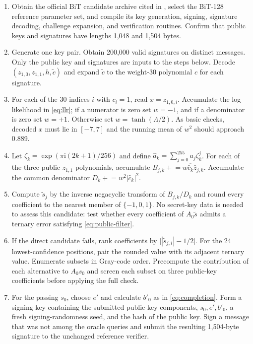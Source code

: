 \documentclass[11pt,a4paper]{article}
\begin{document}
\begin{enumerate}[leftmargin=1.7em]
  \item Obtain the official BiT candidate archive cited in \cite{BiT}, select
        the BiT-128 reference parameter set, and compile its key generation,
        signing, signature decoding, challenge expansion, and verification
        routines.  Confirm that public keys and signatures have lengths 1,048
        and 1,504 bytes.

  \item Generate one key pair.  Obtain 200,000 valid signatures on distinct
        messages.  Only the public key and signatures are inputs to the steps
        below.  Decode $(z_{1,0},z_{1,1},h,\widetilde c)$ and expand
        $\widetilde c$ to the weight-30 polynomial $c$ for each signature.

  \item For each of the 30 indices $i$ with $c_i=1$, read
        $x=z_{1,0,i}$.  Accumulate the log likelihood in \eqref{eq:llr}; if a
        numerator is zero set $w=-1$, and if a denominator is zero set $w=+1$.
        Otherwise set $w=\tanh(\Lambda/2)$.  As basic checks, decoded $x$ must
        lie in $[-7,7]$ and the running mean of $w^2$ should approach 0.889.

  \item Let
        $\zeta_k=\exp(\pi\mathrm{i}(2k+1)/256)$ and define
        $\widehat a_k=\sum_{j=0}^{255}a_j\zeta_k^j$.  For each of the three
        public $z_{1,1}$ polynomials, accumulate
        $B_{j,k}\mathrel{+}=w\overline{\widehat c_k}\widehat z_{j,k}$.
        Accumulate the common denominator
        $D_k\mathrel{+}=w^2|\widehat c_k|^2$.

  \item Compute $\widetilde s_j$ by the inverse negacyclic transform of
        $B_{j,k}/D_k$ and round every coefficient to the nearest member of
        $\{-1,0,1\}$.  No secret-key data is needed to assess this candidate:
        test whether every coefficient of $A_0\widetilde s$ admits a ternary
        error satisfying \eqref{eq:public-filter}.

  \item If the direct candidate fails, rank coefficients by
        $\bigl||\widetilde s_{j,i}|-1/2\bigr|$.  For the 24 lowest-confidence
        positions, pair the rounded value with its adjacent ternary value.
        Enumerate subsets in Gray-code order.  Precompute the contribution of
        each alternative to $A_0s_0$ and screen each subset on three public-key
        coefficients before applying the full check.

  \item For the passing $s_0$, choose $e'$ and calculate $b'_0$ as in
        \eqref{eq:completion}.  Form a signing key containing the submitted
        public-key components, $s_0,e',b'_0$, a fresh signing-randomness seed,
        and the hash of the public key.  Sign a message that was not among the
        oracle queries and submit the resulting 1,504-byte signature to the
        unchanged reference verifier.
\end{enumerate}
\end{document}
